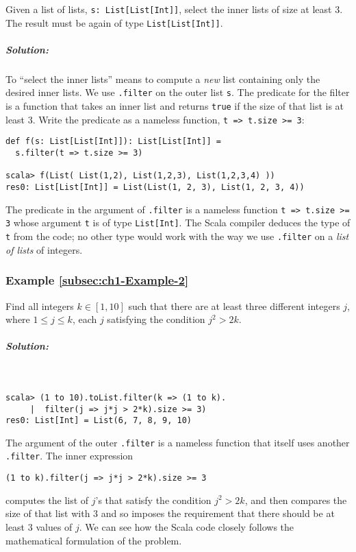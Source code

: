Given a list of lists, \lstinline!s: List[List[Int]]!, select the
inner lists of size at least $3$. The result must be again of type
\lstinline!List[List[Int]]!. 

\subparagraph{Solution:}

To ``select the inner lists'' means to compute a \emph{new} list
containing only the desired inner lists. We use \texttt{}\lstinline!.filter!
on the outer list \lstinline!s!. The predicate for the filter is
a function that takes an inner list and returns \texttt{}\lstinline!true!
if the size of that list is at least $3$. Write the predicate as
a nameless function, \lstinline!t => t.size >= 3!:
\begin{lstlisting}
def f(s: List[List[Int]]): List[List[Int]] =
  s.filter(t => t.size >= 3)

scala> f(List( List(1,2), List(1,2,3), List(1,2,3,4) ))
res0: List[List[Int]] = List(List(1, 2, 3), List(1, 2, 3, 4)) 
\end{lstlisting}
The predicate in the argument of \texttt{}\lstinline!.filter! is
a nameless function \texttt{}\lstinline!t => t.size >= 3! whose
argument \texttt{}\lstinline!t! is of type \lstinline!List[Int]!.
The Scala compiler deduces the type of \lstinline!t! from the code;
no other type would work with the way we use \lstinline!.filter!
on a \emph{list of lists} of integers.

\subsubsection{Example \label{subsec:ch1-Example-2}\ref{subsec:ch1-Example-2}}

Find all integers $k\in\left[1,10\right]$ such that there are at
least three different integers $j$, where $1\leq j\leq k$, each
$j$ satisfying the condition $j^{2}>2k$.

\subparagraph{Solution:}

~

\begin{lstlisting}
scala> (1 to 10).toList.filter(k => (1 to k).
     |  filter(j => j*j > 2*k).size >= 3)
res0: List[Int] = List(6, 7, 8, 9, 10) 
\end{lstlisting}
The argument of the outer \lstinline!.filter! is a nameless function
that itself uses another \lstinline!.filter!. The inner expression
\begin{lstlisting}
(1 to k).filter(j => j*j > 2*k).size >= 3
\end{lstlisting}
computes the list of $j$'s that satisfy the condition $j^{2}>2k$,
and then compares the size of that list with $3$ and so imposes the
requirement that there should be at least $3$ values of $j$. We
can see how the Scala code closely follows the mathematical formulation
of the problem.

